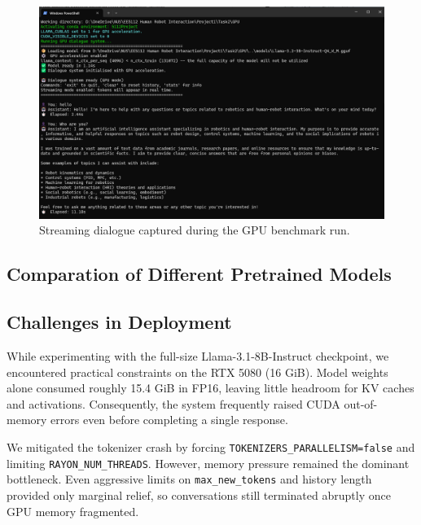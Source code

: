 \documentclass[12pt,a4paper]{article}
\begin{document}
\begin{figure}[H]
    \centering
    \includegraphics[width=1\linewidth]{Figures/llamaGPU.png}
    \caption{Streaming dialogue captured during the GPU benchmark run.}
    \label{fig:llama_gpu_chat}
\end{figure}

\subsection{Comparation of Different Pretrained Models}

\subsection{Challenges in Deployment}

While experimenting with the full-size Llama-3.1-8B-Instruct checkpoint, we encountered practical constraints on the RTX 5080 (16 GiB). Model weights alone consumed roughly 15.4 GiB in FP16, leaving little headroom for KV caches and activations. Consequently, the system frequently raised CUDA out-of-memory errors even before completing a single response.

We mitigated the tokenizer crash by forcing \texttt{TOKENIZERS\_PARALLELISM=false} and limiting \texttt{RAYON\_NUM\_THREADS}. However, memory pressure remained the dominant bottleneck. Even aggressive limits on \texttt{max\_new\_tokens} and history length provided only marginal relief, so conversations still terminated abruptly once GPU memory fragmented.
\end{document}
